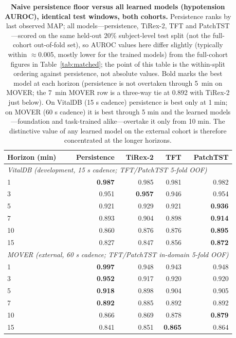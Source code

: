 \begin{table}[ht]
\centering\footnotesize
\caption{\textbf{Naive persistence floor versus all learned models (hypotension AUROC), identical test windows, both cohorts.} Persistence ranks by last observed MAP; all models---persistence, TiRex-2, TFT and PatchTST---scored on the same held-out 20\% subject-level test split (not the full-cohort out-of-fold set), so AUROC values here differ slightly (typically within $\approx$0.005, mostly lower for the trained models) from the full-cohort figures in Table~\ref{tab:matched}; the point of this table is the within-split ordering against persistence, not absolute values. Bold marks the best model at each horizon (persistence is not overtaken through 5~min on MOVER; the 7~min MOVER row is a three-way tie at 0.892 with TiRex-2 just below). On VitalDB (15 s cadence) persistence is best only at 1 min; on MOVER (60 s cadence) it is best through 5 min and the learned models---foundation and task-trained alike---overtake it only from 10 min. The distinctive value of any learned model on the external cohort is therefore concentrated at the longer horizons.}
\label{tab:naive_learned}
\begin{tabular}{lrrrr}
\toprule
Horizon (min) & Persistence & TiRex-2 & TFT & PatchTST \\
\midrule
\multicolumn{5}{l}{\textit{VitalDB (development, 15 s cadence; TFT/PatchTST 5-fold OOF)}}\\
1 & \textbf{0.987} & 0.985 & 0.981 & 0.982 \\
3 & 0.951 & \textbf{0.957} & 0.946 & 0.954 \\
5 & 0.921 & 0.929 & 0.921 & \textbf{0.936} \\
7 & 0.893 & 0.904 & 0.898 & \textbf{0.914} \\
10 & 0.860 & 0.876 & 0.876 & \textbf{0.895} \\
15 & 0.827 & 0.847 & 0.856 & \textbf{0.872} \\
\midrule
\multicolumn{5}{l}{\textit{MOVER (external, 60 s cadence; TFT/PatchTST in-domain 5-fold OOF)}}\\
1 & \textbf{0.997} & 0.948 & 0.943 & 0.948 \\
3 & \textbf{0.952} & 0.917 & 0.920 & 0.920 \\
5 & \textbf{0.918} & 0.898 & 0.904 & 0.905 \\
7 & \textbf{0.892} & 0.885 & 0.892 & 0.892 \\
10 & 0.866 & 0.869 & 0.878 & \textbf{0.879} \\
15 & 0.841 & 0.851 & \textbf{0.865} & 0.864 \\
\bottomrule
\end{tabular}
\end{table}

